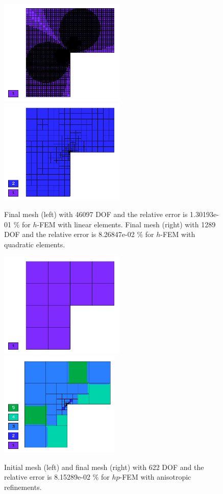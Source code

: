 \documentclass[12pt]{elsarticle}
\begin{document}
\begin{figure}[H]
\centering
\includegraphics[height=5cm]{nist/nist-2/mesh_h1_aniso.png}
\includegraphics[height=5cm]{nist/nist-2/mesh_h2_aniso.png}
\caption{
Final mesh (left) with 46097 DOF and the relative error is 1.30193e-01 \% for $h$-FEM with linear elements.
Final mesh (right) with 1289 DOF and the relative error is 8.26847e-02 \% for $h$-FEM with quadratic elements.}
\label{fig:nist-2-h-aniso}
\end{figure}

\begin{figure}[H]
\centering
\includegraphics[height=5cm]{nist/nist-2/mesh_hp_aniso_init.png}\ \
\includegraphics[height=5cm]{nist/nist-2/mesh_hp_aniso.png}
\caption{Initial mesh (left) and final mesh (right) with 622 DOF and the
relative error is 8.15289e-02 \% for $hp$-FEM with anisotropic refinements.}
\label{fig:nist-2-hp-aniso}
\end{figure}
\end{document}
